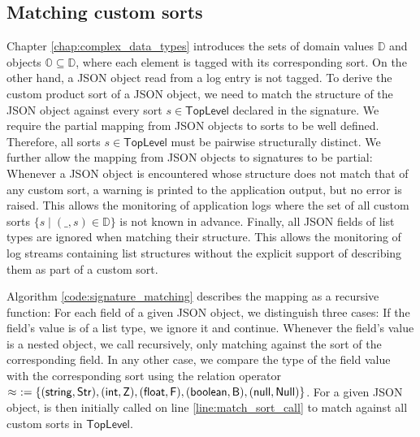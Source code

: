 \subsection{Matching custom sorts}
\label{sec:match_custom_sorts}
Chapter \ref{chap:complex_data_types} introduces the sets of domain values $\mathds{D}$ and objects $\mathds{O} \subseteq \mathds{D}$, where each element is tagged with its corresponding sort. On the other hand, a JSON object read from a log entry is not tagged. To derive the custom product sort of a JSON object, we need to match the structure of the JSON object against every sort $s \in \mathsf{TopLevel}$ declared in the signature. We require the partial mapping from JSON objects to sorts to be well defined. Therefore, all sorts $s \in \mathsf{TopLevel}$ must be pairwise structurally distinct.
We further allow the mapping from JSON objects to signatures to be partial: Whenever a JSON object is encountered whose structure does not match that of any custom sort, a warning is printed to the application output, but no error is raised. This allows the monitoring of application logs where the set of all custom sorts $\{ s \mid (\_,s) \in \mathds{D} \}$ is not known in advance.
Finally, all JSON fields of list types are ignored when matching their structure. This allows the monitoring of log streams containing list structures without the explicit support of describing them as part of a custom sort.

Algorithm \ref{code:signature_matching} describes the mapping as a recursive function: For each field of a given JSON object, we distinguish three cases: If the field's value is of a list type, we ignore it and continue. Whenever the field's value is a nested object, we call  recursively, only matching against the sort of the corresponding field. In any other case, we compare the type of the field value with the corresponding sort using the relation operator $\approx\ := \{ (\mathsf{string}, \mathsf{Str}), (\mathsf{int}, \mathsf{Z}), (\mathsf{float}, \mathsf{F}), (\mathsf{boolean}, \mathsf{B}), (\mathsf{null}, \mathsf{Null}) \}$. For a given JSON object,  is then initially called on line \ref{line:match_sort_call} to match against all custom sorts in $\mathsf{TopLevel}$.


